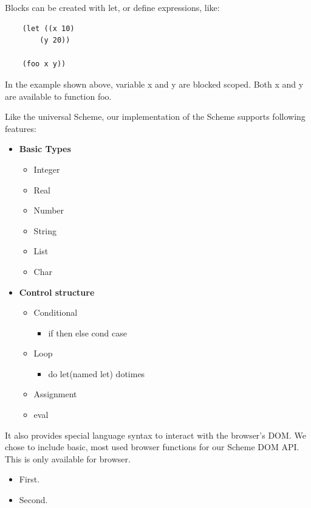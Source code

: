 Blocks can be created with let, or define expressions, like:


\begin{lstlisting}
	(let ((x 10)
		(y 20))
	
	(foo x y))
\end{lstlisting}


In the example shown above, variable x and y are blocked scoped. Both x and y are available to function foo.

Like the universal Scheme, our implementation of the Scheme supports following features:
\begin{itemize}
	\item {\textbf{Basic Types}}
	\begin{itemize}
		\item Integer
		\item Real
		\item Number
		\item String
		\item List
		\item Char
	\end{itemize}
\end{itemize}

\begin{itemize}
	\item{\textbf{Control structure}}
	\begin{itemize}
		\item Conditional
		\begin{itemize}
			\item if then else cond case
		\end{itemize}
		\item Loop
		\begin{itemize}
			\item do let(named let) dotimes
		\end{itemize}
		\item Assignment
		\item eval
	\end{itemize}
\end{itemize}

It also provides special language syntax to interact with the browser's DOM. We chose to include basic, most used browser functions for our Scheme DOM API. This is only available for browser. 

\begin{itemize}[label={}]
	\item First.
	\item Second.
\end{itemize}

